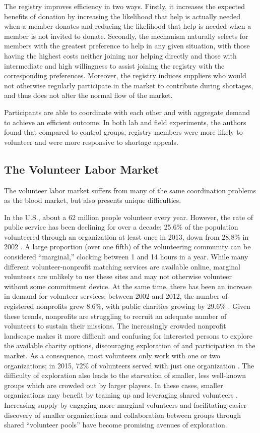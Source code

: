 \documentclass[11pt, margin=1in]{article}
\begin{document}
The registry improves efficiency in two ways. Firstly, it increases the expected benefits of donation by increasing the likelihood that help is actually needed when a member donates and reducing the likelihood that help is needed when a member is not invited to donate. Secondly, the mechanism naturally selects for members with the greatest preference to help in any given situation, with those having the highest costs neither joining nor helping directly and those with intermediate and high willingness to assist joining the registry with the corresponding preferences. Moreover, the registry induces suppliers who would not otherwise regularly participate in the market to contribute during shortages, and thus does not alter the normal flow of the market. 

Participants are able to coordinate with each other and with aggregate demand to achieve an efficient outcome. In both lab \cite{volunteer-registry} and field \cite{blood-registry} experiments, the authors found that compared to control groups, registry members were more likely to volunteer and were more responsive to shortage appeals.

\subsection{The Volunteer Labor Market}
The volunteer labor market suffers from many of the same coordination problems as the blood market, but also presents unique difficulties. 

In the U.S., about a 62 million people volunteer every year. However, the rate of public service has been declining for over a decade; 25.6\% of the population volunteered through an organization at least once in 2013, down from 28.8\% in 2002 \cite{nonprofit-stats}. A large proportion (over one fifth) of the volunteering community can be considered ``marginal,'' clocking between 1 and 14 hours in a year. While many different volunteer-nonprofit matching services are available online, marginal volunteers are unlikely to use these sites and may not otherwise volunteer without some commitment device. At the same time, there has been an increase in demand for volunteer services; between 2002 and 2012, the number of registered nonprofits grew 8.6\%, with public charities growing by 29.6\% \cite{nonprofit-stats}. Given these trends, nonprofits are struggling to recruit an adequate number of volunteers to sustain their missions. The increasingly crowded nonprofit landscape makes it more difficult and confusing for interested persons to explore the available charity options, discouraging exploration of and participation in the market. As a consequence, most volunteers only work with one or two organizations; in 2015, 72\% of volunteers served with just one organization \cite{nonprofit-stats}. The difficulty of exploration also leads to the starvation of smaller, less well-known groups which are crowded out by larger players. In these cases, smaller organizations may benefit by teaming up and leveraging shared volunteers \cite{too-many-nonprofits}. Increasing supply by engaging more marginal volunteers and facilitating easier discovery of smaller organizations and collaboration between groups through shared ``volunteer pools'' have become promising avenues of exploration.
\end{document}
